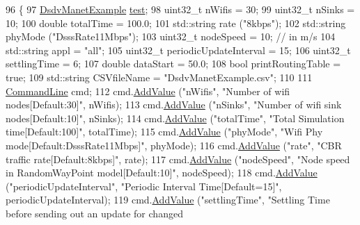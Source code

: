 \begin{DoxyCode}
96 \{
97   \hyperlink{classDsdvManetExample}{DsdvManetExample} \hyperlink{main-test-sync_8cc_a708a4c1a4d0c4acc4c447310dd4db27f}{test};
98   uint32\_t nWifis = 30;
99   uint32\_t nSinks = 10;
100   \textcolor{keywordtype}{double} totalTime = 100.0;
101   std::string rate (\textcolor{stringliteral}{"8kbps"});
102   std::string phyMode (\textcolor{stringliteral}{"DsssRate11Mbps"});
103   uint32\_t nodeSpeed = 10; \textcolor{comment}{// in m/s}
104   std::string appl = \textcolor{stringliteral}{"all"};
105   uint32\_t periodicUpdateInterval = 15;
106   uint32\_t settlingTime = 6;
107   \textcolor{keywordtype}{double} dataStart = 50.0;
108   \textcolor{keywordtype}{bool} printRoutingTable = \textcolor{keyword}{true};
109   std::string CSVfileName = \textcolor{stringliteral}{"DsdvManetExample.csv"};
110 
111   \hyperlink{classns3_1_1CommandLine}{CommandLine} cmd;
112   cmd.\hyperlink{classns3_1_1CommandLine_addcfb546c7ad4c8bd0965654d55beb8e}{AddValue} (\textcolor{stringliteral}{"nWifis"}, \textcolor{stringliteral}{"Number of wifi nodes[Default:30]"}, nWifis);
113   cmd.\hyperlink{classns3_1_1CommandLine_addcfb546c7ad4c8bd0965654d55beb8e}{AddValue} (\textcolor{stringliteral}{"nSinks"}, \textcolor{stringliteral}{"Number of wifi sink nodes[Default:10]"}, nSinks);
114   cmd.\hyperlink{classns3_1_1CommandLine_addcfb546c7ad4c8bd0965654d55beb8e}{AddValue} (\textcolor{stringliteral}{"totalTime"}, \textcolor{stringliteral}{"Total Simulation time[Default:100]"}, totalTime);
115   cmd.\hyperlink{classns3_1_1CommandLine_addcfb546c7ad4c8bd0965654d55beb8e}{AddValue} (\textcolor{stringliteral}{"phyMode"}, \textcolor{stringliteral}{"Wifi Phy mode[Default:DsssRate11Mbps]"}, phyMode);
116   cmd.\hyperlink{classns3_1_1CommandLine_addcfb546c7ad4c8bd0965654d55beb8e}{AddValue} (\textcolor{stringliteral}{"rate"}, \textcolor{stringliteral}{"CBR traffic rate[Default:8kbps]"}, rate);
117   cmd.\hyperlink{classns3_1_1CommandLine_addcfb546c7ad4c8bd0965654d55beb8e}{AddValue} (\textcolor{stringliteral}{"nodeSpeed"}, \textcolor{stringliteral}{"Node speed in RandomWayPoint model[Default:10]"}, nodeSpeed);
118   cmd.\hyperlink{classns3_1_1CommandLine_addcfb546c7ad4c8bd0965654d55beb8e}{AddValue} (\textcolor{stringliteral}{"periodicUpdateInterval"}, \textcolor{stringliteral}{"Periodic Interval Time[Default=15]"}, 
      periodicUpdateInterval);
119   cmd.\hyperlink{classns3_1_1CommandLine_addcfb546c7ad4c8bd0965654d55beb8e}{AddValue} (\textcolor{stringliteral}{"settlingTime"}, \textcolor{stringliteral}{"Settling Time before sending out an update for changed
}
\end{DoxyCode}
